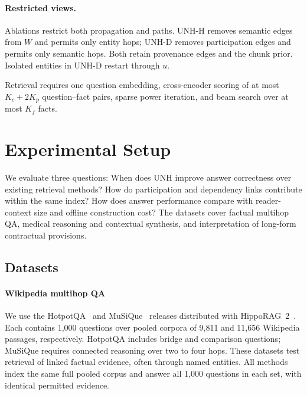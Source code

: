 \documentclass[sigconf, review, anonymous]{acmart}
\newcommand{\sys}{UNH}
\begin{document}
\paragraph{Restricted views.}
Ablations restrict both propagation and paths. UNH-H removes semantic edges from $W$ and permits only entity hops; UNH-D removes participation edges and permits only semantic hops. Both retain provenance edges and the chunk prior. Isolated entities in UNH-D restart through $u$.

Retrieval requires one question embedding, cross-encoder scoring of at most $K_c+2K_p$ question--fact pairs, sparse power iteration, and beam search over at most $K_f$ facts.





\section{Experimental Setup}
\label{sec:experiments}

We evaluate three questions: When does \sys{} improve answer correctness over existing retrieval methods? How do participation and dependency links contribute within the same index? How does answer performance compare with reader-context size and offline construction cost? The datasets cover factual multihop QA, medical reasoning and contextual synthesis, and interpretation of long-form contractual provisions.

\subsection{Datasets}
\label{sec:datasets}

\paragraph{Wikipedia multihop QA}
We use the HotpotQA~\cite{yang2018hotpotqa} and MuSiQue~\cite{trivedi2022musique} releases distributed with HippoRAG~2~\cite{gutierrez2025rag}. Each contains 1,000 questions over pooled corpora of 9,811 and 11,656 Wikipedia passages, respectively. HotpotQA includes bridge and comparison questions; MuSiQue requires connected reasoning over two to four hops. These datasets test retrieval of linked factual evidence, often through named entities. All methods index the same full pooled corpus and answer all 1,000 questions in each set, with identical permitted evidence.
\end{document}
